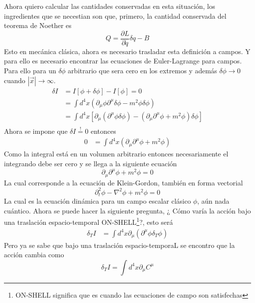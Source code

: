 \documentclass[../main.tex]{subfiles}
\begin{document}
Ahora quiero calcular las cantidades conservadas en esta situación, los ingredientes que se necestian son que, primero, la cantidad conservada del teorema de Noether es
\begin{equation*}
  Q=\frac{\partial L}{\partial \dot{q}}\delta q - B
\end{equation*}
Esto en mecánica clásica, ahora es necesario trasladar esta definición a campos. Y para ello es necesario encontrar las ecuaciones de Euler-Lagrange para campos. Para ello para un $\delta \phi$ arbitrario que sera cero en los extremos y además $\delta \phi \to 0$ cuando $|\vec{x}|\to\infty$. 
\begin{align*}
  \delta I & = I[\phi + \delta \phi] - I[\phi] = 0 \\
  & = \int d^4x \left( \partial_\mu \phi \partial^\mu \delta \phi - m^2\phi \delta \phi \right) \\
  & = \int d^4x \left[ \partial_\mu \left( \partial^\mu \phi \delta \phi \right) - \left( \partial_\mu \partial^\mu \phi + m^2 \phi \right) \delta \phi\right] \\
\end{align*}
Ahora se impone que $\delta I \stackrel{!}{=}0$ entonces
\begin{align*}
  0 & = \int d^4 x \left(\partial_\mu \partial^\mu \phi + m^2 \phi \right)
\end{align*}
Como la integral está en un volumen arbitrario entonces necesariamente el integrando debe ser cero y se llega a la siguiente ecuación
\begin{equation}
  \partial_\mu \partial^\mu \phi + m^2\phi = 0
\end{equation}
La cual corresponde a la ecuación de Klein-Gordon, también en forma vectorial
\begin{equation}
  \partial_t^2\phi - \nabla^2\phi + m^2\phi = 0
\end{equation}
La cual es la ecuación dinámica para un campo escalar clásico $\phi$, aún nada cuántico. Ahora se puede hacer la siguiente pregunta, ¿ Cómo varía la acción bajo una traslación espacio-temporal ON-SHELL\footnote{ON-SHELL significa que es cuando las ecuaciones de campo son satisfechas}?, esto será
\begin{align*}
  \delta_T I & = \int d^4 x \partial_\mu\left(  \partial^\mu \phi \delta_T\phi\right)
\end{align*}
Pero ya se sabe que bajo una traslación espacio-temporaL se encontro que la acción cambia como
\begin{equation*}
  \delta_T I = \int d^4x \partial_\mu C^\mu
\end{equation*}
\end{document}
